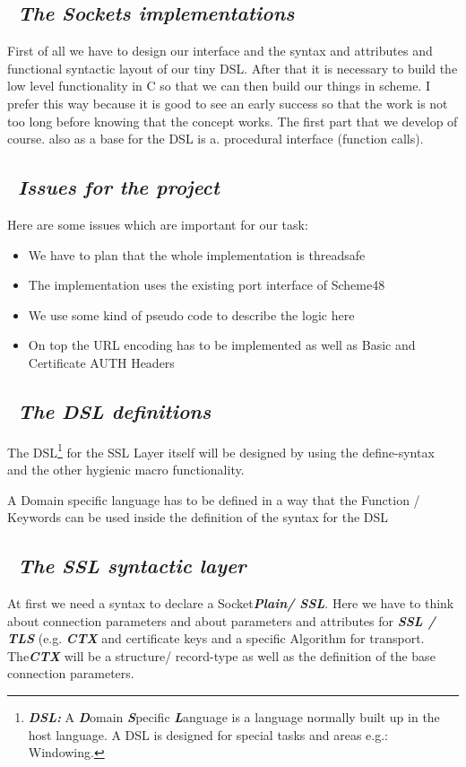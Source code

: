 \documentclass[10pt,a4paper,english]{article}
\newcommand{\rubric}[1]{\subsection*{~\hfill {\it #1} \hfill ~}}
\newcommand{\abbrhighcol}[1]{\textbf{\textit{#1}}}
\begin{document}
\begin{multicols}{2}
\rubric{The Sockets implementations }
\begin{flushleft}
First of all we have to design our interface and the syntax and attributes and functional syntactic layout of our tiny DSL. After that it is necessary to build the low level functionality in C so that we can then build our things in scheme. I prefer this way because it is good to see an early success so that the work is not too long before knowing that the concept works. The first part that we develop of course. also as a base for the DSL is a. procedural interface (function calls).
\end{flushleft}
\rubric{Issues for the project}
\begin{flushleft}
Here are some issues  which are important for our task:
\begin{itemize}
\item We have to plan that the whole implementation is threadsafe

\item The implementation uses the existing port interface of Scheme48

\item We use some kind of pseudo code to describe the logic here

\item On top the URL encoding has to be implemented as well as Basic and Certificate AUTH Headers 
\end{itemize}
\end{flushleft}

\rubric{The DSL definitions}
\begin{flushleft}
The DSL\footnote{\abbrhighcol{DSL: } A \abbrhighcol {D}omain \abbrhighcol{S}pecific \abbrhighcol{L}anguage is a language normally built up in the host language. A DSL is designed for special tasks and areas e.g.: Windowing.} for the SSL Layer itself will be designed by using the define-syntax and the other hygienic macro functionality.
\end{flushleft}
A Domain specific language has to be defined in a way that the Function / Keywords can be used inside the definition of the syntax for the DSL

\rubric{The SSL syntactic layer}
\begin{flushleft}
 At first we need a syntax to declare a Socket\abbrhighcol  {Plain/ SSL}. Here we have to think about connection parameters and about parameters and attributes for \abbrhighcol  {SSL / TLS} (e.g. \abbrhighcol  {CTX} and certificate keys and a specific Algorithm for transport. 
The\abbrhighcol  {CTX} will be a structure/ record-type as well as the definition of the base connection parameters. 
\end{flushleft}

\end{multicols}
\end{document}
